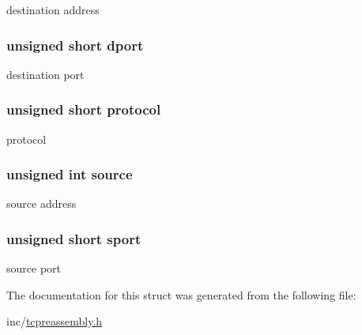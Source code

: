 destination address 

\hypertarget{structntoh__tcp__tuple5__t_a1fdc28da1e85b5968e0ce83dcb106287}{
\subsubsection[{dport}]{\setlength{\rightskip}{0pt plus 5cm}unsigned short dport}}\label{structntoh__tcp__tuple5__t_a1fdc28da1e85b5968e0ce83dcb106287}


destination port 

\hypertarget{structntoh__tcp__tuple5__t_ac61644f2747d106fe73d2aba4384a2ba}{
\subsubsection[{protocol}]{\setlength{\rightskip}{0pt plus 5cm}unsigned short protocol}}\label{structntoh__tcp__tuple5__t_ac61644f2747d106fe73d2aba4384a2ba}


protocol 

\hypertarget{structntoh__tcp__tuple5__t_a32ee136f9a3309d9f5aec70ddaebc420}{
\subsubsection[{source}]{\setlength{\rightskip}{0pt plus 5cm}unsigned int source}}\label{structntoh__tcp__tuple5__t_a32ee136f9a3309d9f5aec70ddaebc420}


source address 

\hypertarget{structntoh__tcp__tuple5__t_a7122c66c4668cd4ee36485bd9009ca6d}{
\subsubsection[{sport}]{\setlength{\rightskip}{0pt plus 5cm}unsigned short sport}}\label{structntoh__tcp__tuple5__t_a7122c66c4668cd4ee36485bd9009ca6d}


source port 



The documentation for this struct was generated from the following file\-:\begin{DoxyCompactItemize}
\item 
inc/\hyperlink{tcpreassembly_8h}{tcpreassembly.\-h}\end{DoxyCompactItemize}
